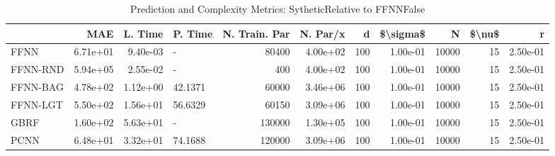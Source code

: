 \begin{table}
\centering
\caption{Prediction and Complexity Metrics: SytheticRelative to FFNNFalse}
\label{tab__Sythetic__Fix_Neurons_QTrue}
\begin{tabular}{lrrlrrrrrrr}
\toprule
{} &      MAE &  L. Time &  P. Time &  N. Train. Par &  N. Par/x &    d &  \$\textbackslash sigma\$ &      N &  \$\textbackslash nu\$ &        r \\
\midrule
FFNN     & 6.71e+01 & 9.40e-03 &        -  &          80400 &  4.00e+02 &  100 &  1.00e-01 &  10000 &     15 & 2.50e-01 \\
FFNN-RND & 5.94e+05 & 2.55e-02 &        - &            400 &  4.00e+02 &  100 &  1.00e-01 &  10000 &     15 & 2.50e-01 \\
FFNN-BAG & 4.78e+02 & 1.12e+00 &  42.1371 &          60000 &  3.46e+06 &  100 &  1.00e-01 &  10000 &     15 & 2.50e-01 \\
FFNN-LGT & 5.50e+02 & 1.56e+01 &  56.6329 &          60150 &  3.09e+06 &  100 &  1.00e-01 &  10000 &     15 & 2.50e-01 \\
GBRF     & 1.60e+02 & 5.63e+01 &        - &         130000 &  1.30e+05 &  100 &  1.00e-01 &  10000 &     15 & 2.50e-01 \\
PCNN     & 6.48e+01 & 3.32e+01 &  74.1688 &         120000 &  3.09e+06 &  100 &  1.00e-01 &  10000 &     15 & 2.50e-01 \\
\bottomrule
\end{tabular}
\end{table}
